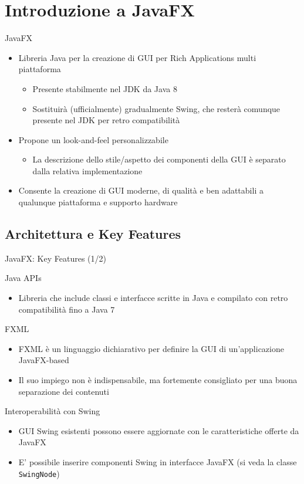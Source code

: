 \documentclass[presentation]{beamer}
\begin{document}
\section{Introduzione a JavaFX}

\begin{frame}{JavaFX}
\begin{itemize}\itemsep20pt
\item Libreria Java per la creazione di GUI per Rich Applications multi piattaforma
\begin{itemize}
\item Presente stabilmente nel JDK da Java 8
\item Sostituirà (ufficialmente) gradualmente Swing, che resterà comunque presente nel JDK per retro compatibilità
\end{itemize}
\item Propone un look-and-feel personalizzabile
\begin{itemize}
\item La descrizione dello stile/aspetto dei componenti della GUI è separato dalla relativa implementazione
\end{itemize}
\item Consente la creazione di GUI moderne, di qualità e ben adattabili a qualunque piattaforma e supporto hardware
\end{itemize}
\end{frame}

\subsection{Architettura e Key Features}

\begin{frame}{JavaFX: Key Features (1/2)}
\begin{block}{Java APIs}
\begin{itemize}
\item Libreria che include classi e interfacce scritte in Java e compilato con retro compatibilità fino a Java 7
\end{itemize}
\end{block}
%
\begin{block}{FXML}
\begin{itemize}
\item FXML è un linguaggio dichiarativo per definire la GUI di un'applicazione JavaFX-based
\item Il suo impiego non è indispensabile, ma fortemente consigliato per una buona separazione dei contenuti
\end{itemize}
\end{block}
%
\begin{block}{Interoperabilità con Swing}
\begin{itemize}
\item GUI Swing esistenti possono essere aggiornate con le caratteristiche offerte da JavaFX
\item E' possibile inserire componenti Swing in interfacce JavaFX (si veda la classe \texttt{SwingNode})
\end{itemize}
\end{block}
\end{frame}
\end{document}

